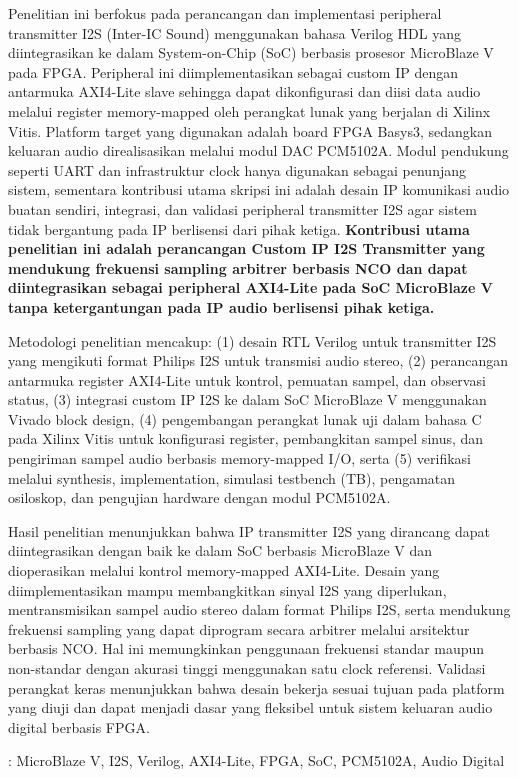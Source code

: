 \hspace{1cm}Penelitian ini berfokus pada perancangan dan implementasi peripheral transmitter I2S (Inter-IC Sound) menggunakan bahasa Verilog HDL yang diintegrasikan ke dalam System-on-Chip (SoC) berbasis prosesor MicroBlaze V pada FPGA. Peripheral ini diimplementasikan sebagai custom IP dengan antarmuka AXI4-Lite slave sehingga dapat dikonfigurasi dan diisi data audio melalui register memory-mapped oleh perangkat lunak yang berjalan di Xilinx Vitis. Platform target yang digunakan adalah board FPGA Basys3, sedangkan keluaran audio direalisasikan melalui modul DAC PCM5102A. Modul pendukung seperti UART dan infrastruktur clock hanya digunakan sebagai penunjang sistem, sementara kontribusi utama skripsi ini adalah desain IP komunikasi audio buatan sendiri, integrasi, dan validasi peripheral transmitter I2S agar sistem tidak bergantung pada IP berlisensi dari pihak ketiga. \textbf{Kontribusi utama penelitian ini adalah perancangan Custom IP I2S Transmitter yang mendukung frekuensi sampling arbitrer berbasis NCO dan dapat diintegrasikan sebagai peripheral AXI4-Lite pada SoC MicroBlaze V tanpa ketergantungan pada IP audio berlisensi pihak ketiga.}

\hspace{1cm}Metodologi penelitian mencakup: (1) desain RTL Verilog untuk transmitter I2S yang mengikuti format Philips I2S untuk transmisi audio stereo, (2) perancangan antarmuka register AXI4-Lite untuk kontrol, pemuatan sampel, dan observasi status, (3) integrasi custom IP I2S ke dalam SoC MicroBlaze V menggunakan Vivado block design, (4) pengembangan perangkat lunak uji dalam bahasa C pada Xilinx Vitis untuk konfigurasi register, pembangkitan sampel sinus, dan pengiriman sampel audio berbasis memory-mapped I/O, serta (5) verifikasi melalui synthesis, implementation, simulasi testbench (TB), pengamatan osiloskop, dan pengujian hardware dengan modul PCM5102A.

\hspace{1cm}Hasil penelitian menunjukkan bahwa IP transmitter I2S yang dirancang dapat diintegrasikan dengan baik ke dalam SoC berbasis MicroBlaze V dan dioperasikan melalui kontrol memory-mapped AXI4-Lite. Desain yang diimplementasikan mampu membangkitkan sinyal I2S yang diperlukan, mentransmisikan sampel audio stereo dalam format Philips I2S, serta mendukung frekuensi sampling yang dapat diprogram secara arbitrer melalui arsitektur berbasis NCO. Hal ini memungkinkan penggunaan frekuensi standar maupun non-standar dengan akurasi tinggi menggunakan satu clock referensi. Validasi perangkat keras menunjukkan bahwa desain bekerja sesuai tujuan pada platform yang diuji dan dapat menjadi dasar yang fleksibel untuk sistem keluaran audio digital berbasis FPGA.


 : MicroBlaze V, I2S, Verilog, AXI4-Lite, FPGA, SoC, PCM5102A, Audio Digital

